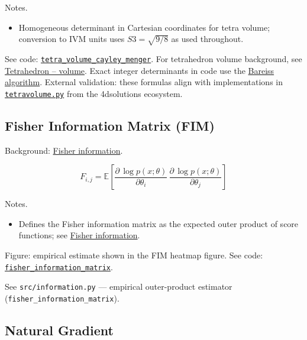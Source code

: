 \documentclass[
  10pt,
]{article}
\providecommand{\tightlist}{%
  \setlength{\itemsep}{0pt}\setlength{\parskip}{0pt}}
\begin{document}
Notes.

\begin{itemize}
\tightlist
\item
  Homogeneous determinant in Cartesian coordinates for tetra volume;
  conversion to IVM units uses \(S3=\sqrt{9/8}\) as used throughout.
\end{itemize}

See code:
\href{03_quadray_methods.md\#code:tetra_volume_cayley_menger}{\texttt{tetra\_volume\_cayley\_menger}}.
For tetrahedron volume background, see
\href{https://en.wikipedia.org/wiki/Tetrahedron\#Volume}{Tetrahedron --
volume}. Exact integer determinants in code use the
\href{https://en.wikipedia.org/wiki/Bareiss_algorithm}{Bareiss
algorithm}. External validation: these formulas align with
implementations in
\href{https://github.com/4dsolutions/m4w/blob/main/tetravolume.py}{\texttt{tetravolume.py}}
from the 4dsolutions ecosystem.

\hypertarget{eq:fim}{%
\subsection{Fisher Information Matrix (FIM)}\label{eq:fim}}

Background:
\href{https://en.wikipedia.org/wiki/Fisher_information}{Fisher
information}.

\begin{equation}\label{eq:supp_fim}
F_{i,j} = \mathbb{E}\left[ \frac{\partial \, \log p(x;\theta)}{\partial \theta_i}\, \frac{\partial \, \log p(x;\theta)}{\partial \theta_j} \right]
\end{equation}

Notes.

\begin{itemize}
\tightlist
\item
  Defines the Fisher information matrix as the expected outer product of
  score functions; see
  \href{https://en.wikipedia.org/wiki/Fisher_information}{Fisher
  information}.
\end{itemize}

Figure: empirical estimate shown in the FIM heatmap figure. See code:
\href{03_quadray_methods.md\#code:fisher_information_matrix}{\texttt{fisher\_information\_matrix}}.

See \texttt{src/information.py} --- empirical outer-product estimator
(\texttt{fisher\_information\_matrix}).

\hypertarget{eq:natgrad}{%
\subsection{Natural Gradient}\label{eq:natgrad}}
\end{document}
